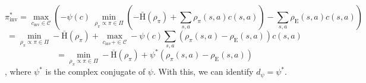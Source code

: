 \begin{equation}
    \label{proto_inf_ler_c_reg}
    \pi_{\text{inv}}^* = \max_{c_{\text{inv}} \in \mathcal{C}} \left(-\psi(c) \ \min_{\rho_\pi \propto \pi \in \Pi} \left(- \bar{\text{H}}(\rho_\pi) + \sum_{s,a} \rho_\pi(s,a) c(s,a) \right) - \sum_{s,a} \rho_{\text{E}}(s,a) c(s,a) \right)
\end{equation}
\begin{equation*}
    = \min_{\rho_\pi \propto \pi \in \Pi}- \bar{\text{H}}(\rho_\pi) + \max_{c_{\text{inv}} + \in \mathcal{C}} -\psi(c) \sum_{s,a} \left( \rho_\pi(s,a) - \rho_{\text{E}}(s,a)\right) c(s,a)
\end{equation*}
\begin{equation*}
    = \min_{\rho_\pi \propto \pi \in \Pi}- \bar{\text{H}}(\rho_\pi) + \psi^*(\rho_\pi(s,a) - \rho_{\text{E}}(s,a))
\end{equation*}
, where $\psi^*$ is the complex conjugate of $\psi$. With this, we can identify $d_{\psi} = \psi^*$.\\

